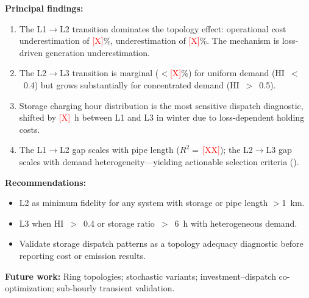 \documentclass[review,3p]{elsarticle}
\newcommand{\placeholder}[1]{\textcolor{red}{[#1]}}
\begin{document}
\textbf{Principal findings:}
\begin{enumerate}[nosep]
    \item The L1$\rightarrow$L2 transition dominates the topology
    effect: operational cost underestimation of \placeholder{X}\%,
     underestimation of \placeholder{X}\%. The mechanism is
    loss-driven generation underestimation.

    \item The L2$\rightarrow$L3 transition is marginal
    ($<$\placeholder{X}\%) for uniform demand (HI~$<$~0.4) but grows
    substantially for concentrated demand (HI~$>$~0.5).

    \item Storage charging hour distribution is the most sensitive
    dispatch diagnostic, shifted by \placeholder{X}~h between L1
    and L3 in winter due to loss-dependent holding costs.

    \item The L1$\rightarrow$L2 gap scales with pipe length
    ($R^2\!=\,$\placeholder{XX}); the L2$\rightarrow$L3 gap scales
    with demand heterogeneity---yielding actionable selection criteria
    ().
\end{enumerate}

\textbf{Recommendations:}
\begin{itemize}[nosep]
    \item L2 as minimum fidelity for any system with storage or pipe
    length $>$1~km.
    \item L3 when HI~$>$~0.4 or storage ratio~$>$~6~h with
    heterogeneous demand.
    \item Validate storage dispatch patterns as a topology adequacy
    diagnostic before reporting cost or emission results.
\end{itemize}

\textbf{Future work:} Ring topologies; stochastic variants;
investment--dispatch co-optimization; sub-hourly transient
validation.
\end{document}
